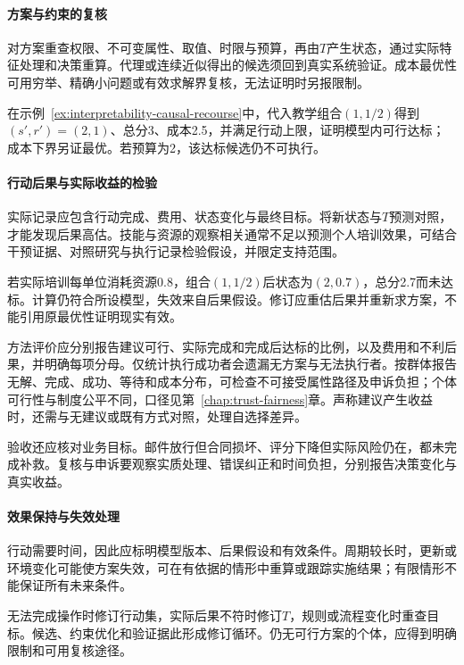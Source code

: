 \paragraph{方案与约束的复核}

对方案重查权限、不可变属性、取值、时限与预算，再由$T$产生状态，通过实际特征处理和决策重算。代理或连续近似得出的候选须回到真实系统验证。成本最优性可用穷举、精确小问题或有效求解界复核，无法证明时另报限制。

在示例~\ref{ex:interpretability-causal-recourse}中，代入教学组合$(1,1/2)$得到$(s',r')=(2,1)$、总分3、成本2.5，并满足行动上限，证明模型内可行达标；成本下界另证最优。若预算为2，该达标候选仍不可执行。

\paragraph{行动后果与实际收益的检验}

实际记录应包含行动完成、费用、状态变化与最终目标。将新状态与$T$预测对照，才能发现后果高估。技能与资源的观察相关通常不足以预测个人培训效果，可结合干预证据、对照研究与执行记录检验假设，并限定支持范围。

若实际培训每单位消耗资源0.8，组合$(1,1/2)$后状态为$(2,0.7)$，总分2.7而未达标。计算仍符合所设模型，失效来自后果假设。修订应重估后果并重新求方案，不能引用原最优性证明现实有效。

方法评价应分别报告建议可行、实际完成和完成后达标的比例，以及费用和不利后果，并明确每项分母。仅统计执行成功者会遗漏无方案与无法执行者。按群体报告无解、完成、成功、等待和成本分布，可检查不可接受属性路径及申诉负担；个体可行性与制度公平不同，口径见第~\ref{chap:trust-fairness}章。声称建议产生收益时，还需与无建议或既有方式对照，处理自选择差异。

验收还应核对业务目标。邮件放行但合同损坏、评分下降但实际风险仍在，都未完成补救。复核与申诉要观察实质处理、错误纠正和时间负担，分别报告决策变化与真实收益。

\paragraph{效果保持与失效处理}

行动需要时间，因此应标明模型版本、后果假设和有效条件。周期较长时，更新或环境变化可能使方案失效，可在有依据的情形中重算或跟踪实施结果；有限情形不能保证所有未来条件。

无法完成操作时修订行动集，实际后果不符时修订$T$，规则或流程变化时重查目标。候选、约束优化和验证据此形成修订循环。仍无可行方案的个体，应得到明确限制和可用复核途径。

